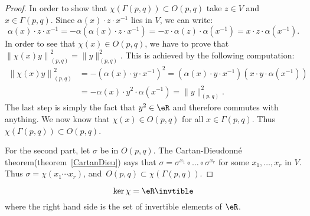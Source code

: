 \begin{proof}
	In order to show that $\chi(\Gamma(p,q))\subset O(p,q)$ take $z\in V$ and $x\in\Gamma(p,q)$. Since $\alpha(x)\cdot z\cdot x^{-1}$ lies in $V$, we can write:
	\[
		\alpha(x)\cdot z\cdot x^{-1}=-\alpha\left(\alpha(x)\cdot z\cdot x^{-1}\right)
		=-x\cdot\alpha(z)\cdot\alpha(x^{-1})=x\cdot z\cdot\alpha(x^{-1}).
	\]
	In order to see that $\chi(x)\in O(p,q)$, we have to prove that $\left\|\chi(x)y\right\|_{(p,q)}^2=\|y\|_{(p,q)}^2$. This is achieved by the following computation:
	\begin{equation}
		\begin{split}
			\left\|\chi(x)y\right\|_{(p,q)}^2&=-\left(\alpha(x)\cdot y\cdot x^{-1}\right)^2
			=\left(\alpha(x)\cdot y\cdot x^{-1}\right)\left(x\cdot y\cdot\alpha(x^{-1})\right)\\
			&=-\alpha(x)\cdot y^2\cdot\alpha(x^{-1})
			=\|y\|^2_{(p,q)}.
		\end{split}
	\end{equation}
	The last step is simply the fact that $y^2\in\eR$ and therefore commutes with anything. We now know that $\chi(x)\in O(p,q)$ for all $x\in\Gamma(p,q)$. Thus $\chi(\Gamma(p,q))\subset O(p,q)$.

	For the second part, let $\sigma$ be in $O(p,q)$. The Cartan-Dieudonné theorem(theorem~\ref{CartanDieu}) says that $\sigma=\sigma^{x_1}\circ\ldots\circ\sigma^{x_r}$ for some $x_1,\ldots, x_r$ in $V$. Thus $\sigma=\chi(x_1\cdots x_r)$, \hbox{and $O(p,q)\subset\chi(\Gamma(p,q))$}.
\end{proof}

\begin{proposition}
	\begin{equation}
		\ker\chi=\eR\invtible
	\end{equation}
	where the right hand side is the set of invertible elements of $\eR$.
	\label{prop1001p1}
\end{proposition}

